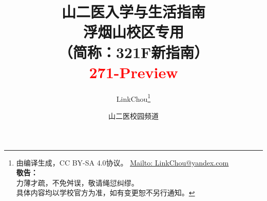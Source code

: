 

\title{%
\normalsize
{\Huge\textbf{山二医入学与生活指南}}\\[6pt]
{\large\textbf{浮烟山校区专用}}\\
（简称：321F新指南）\\[15pt]
{\large\textcolor{red}{271-Preview}}\vspace*{-25pt}}
\author{LinkChou\thanks{由\LaTeXe 编译生成，CC BY-SA 4.0协议。%
\uline{\href{Mailto:LinkChou@yandex.com}{Mailto: LinkChou@yandex.com}}\\%
\textbf{敬告：}\\%
\indent\indent 力薄才疏，不免舛误，敬请绳愆纠缪。\\%
\indent\indent 具体内容均以学校官方为准，如有变更恕不另行通知。}\and 山二医校园频道}
\date{\DTMnow}
\maketitle

\renewcommand{\thefootnote}{\arabic{footnote}}

\tableofcontents